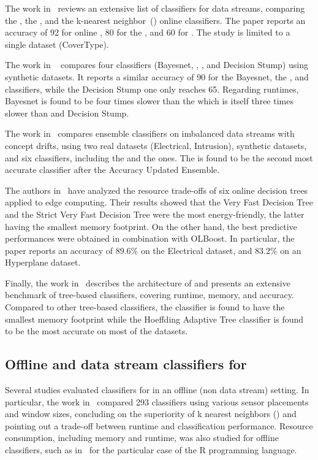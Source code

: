 The work in~\cite{prasad2016stream} reviews an extensive list of classifiers for
data streams, comparing the \hoeffdingtree, the \naivebayes, and the k-nearest
neighbor~(\knn) online classifiers. The paper reports an accuracy of 92 for
online \knn, 80 for the \hoeffdingtree, and 60 for \naivebayes. The study is
limited to a single dataset (CoverType). 

The work in ~\cite{kaur2020} compares four classifiers (Bayesnet,
\hoeffdingtree, \naivebayes, and Decision Stump) using synthetic datasets.  It
reports a similar accuracy of 90 for the Bayesnet, the \hoeffdingtree, and
\naivebayes classifiers, while the Decision Stump one only reaches 65. Regarding
runtimes, Bayesnet is found to be four times slower than the \hoeffdingtree
which is itself three times slower than \naivebayes and Decision Stump.

The work in~\cite{priya2020comprehensive} compares ensemble classifiers on
imbalanced data streams with concept drifts, using two real datasets
(Electrical, Intrusion), synthetic datasets, and six classifiers, including the
\naivebayes and the \hoeffdingtree ones. The \hoeffdingtree is found to be the
second most accurate classifier after the Accuracy Updated Ensemble.

The authors in~\cite{lopes2020evaluating} have analyzed the resource trade-offs
of six online decision trees applied to edge computing. Their results showed
that the Very Fast Decision Tree and the Strict Very Fast Decision Tree were the
most energy-friendly, the latter having the smallest memory footprint. On the
other hand, the best predictive performances were obtained in combination with
OLBoost. In particular, the paper reports an accuracy of 89.6\% on the
Electrical dataset, and 83.2\% on an Hyperplane dataset.

Finally, the work in~\cite{StreamDM-CPP} describes the architecture of
\streamdmcpp and presents an extensive benchmark of tree-based classifiers,
covering runtime, memory, and accuracy. Compared to other tree-based
classifiers, the \hoeffdingtree classifier is found to have the smallest memory
footprint while the Hoeffding Adaptive Tree classifier is found to be the most
accurate on most of the datasets. 

\subsection{Offline and data stream classifiers for \har}
Several studies evaluated classifiers for \har in an offline (non data stream)
setting. In particular, the work in~\cite{Janidarmian_2017} compared 293
classifiers using various sensor placements and window sizes, concluding on the
superiority of k nearest neighbors (\knn) and pointing out a trade-off between
runtime and classification performance. Resource consumption, including memory
and runtime, was also studied for offline classifiers, such as
in~\cite{memory_consumption_machine_learning} for the particular case of the R
programming language.

